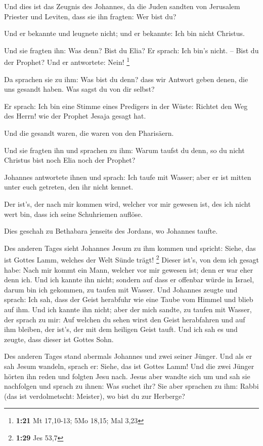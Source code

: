 Und dies ist das Zeugnis des Johannes, da die Juden
sandten von Jerusalem Priester und Leviten, dass sie ihn fragten: Wer
bist du?

 Und er bekannte und leugnete nicht; und er bekannte: Ich
bin nicht Christus.

 Und sie fragten ihn: Was denn? Bist du Elia? Er sprach:
Ich bin's nicht. -- Bist du der Prophet? Und er antwortete: Nein!
\footnote{\textbf{1:21} Mt 17,10-13; 5Mo 18,15; Mal 3,23}

 Da sprachen sie zu ihm: Was bist du denn? dass wir Antwort
geben denen, die uns gesandt haben. Was sagst du von dir selbst?

 Er sprach: Ich bin eine Stimme eines Predigers in der
Wüste: Richtet den Weg des Herrn! wie der Prophet Jesaja gesagt hat.

 Und die gesandt waren, die waren von den Pharisäern.

 Und sie fragten ihn und sprachen zu ihm: Warum taufst du
denn, so du nicht Christus bist noch Elia noch der Prophet?

 Johannes antwortete ihnen und sprach: Ich taufe mit
Wasser; aber er ist mitten unter euch getreten, den ihr nicht kennet.

 Der ist's, der nach mir kommen wird, welcher vor mir
gewesen ist, des ich nicht wert bin, dass ich seine Schuhriemen auflöse.

 Dies geschah zu Bethabara jenseits des Jordans, wo
Johannes taufte.

 Des anderen Tages sieht Johannes Jesum zu ihm kommen und
spricht: Siehe, das ist Gottes Lamm, welches der Welt Sünde trägt!
\footnote{\textbf{1:29} Jes 53,7}  Dieser ist's, von dem
ich gesagt habe: Nach mir kommt ein Mann, welcher vor mir gewesen ist;
denn er war eher denn ich.  Und ich kannte ihn nicht;
sondern auf dass er offenbar würde in Israel, darum bin ich gekommen, zu
taufen mit Wasser.  Und Johannes zeugte und sprach: Ich
sah, dass der Geist herabfuhr wie eine Taube vom Himmel und blieb auf
ihm.  Und ich kannte ihn nicht; aber der mich sandte, zu
taufen mit Wasser, der sprach zu mir: Auf welchen du sehen wirst den
Geist herabfahren und auf ihm bleiben, der ist's, der mit dem heiligen
Geist tauft.  Und ich sah es und zeugte, dass dieser ist
Gottes Sohn.

 Des anderen Tages stand abermals Johannes und zwei seiner
Jünger.  Und als er sah Jesum wandeln, sprach er: Siehe,
das ist Gottes Lamm!  Und die zwei Jünger hörten ihn reden
und folgten Jesu nach.  Jesus aber wandte sich um und sah
sie nachfolgen und sprach zu ihnen: Was suchet ihr? Sie aber sprachen zu
ihm: Rabbi (das ist verdolmetscht: Meister), wo bist du zur Herberge?

